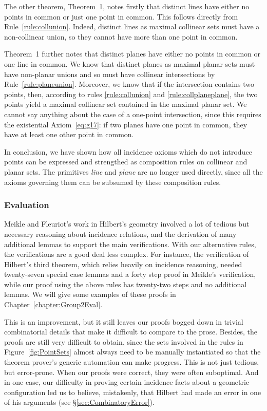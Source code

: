 The other theorem, Theorem~1, notes firstly that distinct lines have either no points in common or just one point in common. This follows directly from Rule~\ref{rule:collunion}. Indeed, distinct lines as maximal collinear sets must have a non-collinear union, so they cannot have more than one point in common. 

Theorem~1 further notes that distinct planes have either no points in common or one line in common. We know that distinct planes as maximal planar sets must have non-planar unions and so must have collinear intersections by Rule~\ref{rule:planeunion}. Moreover, we know that if the intersection contains two points, then, according to rules \ref{rule:collunion} and \ref{rule:collplaneplane}, the two points yield a maximal collinear set contained in the maximal planar set. We cannot say anything about the case of a one-point intersection, since this requires the existential Axiom~\ref{eq:g17}: if two planes have one point in common, they have at least one other point in common.

In conclusion, we have shown how all incidence axioms which do not introduce points can be expressed and strengthed as composition rules on collinear and planar sets. The primitives \emph{line} and \emph{plane} are no longer used directly, since all the axioms governing them can be subsumed by these composition rules. 

\subsubsection{Evaluation}
Meikle and Fleuriot's work in Hilbert's geometry involved a lot of tedious but necessary reasoning about incidence relations, and the derivation of many additional lemmas to support the main verifications. With our alternative rules, the verifications are a good deal less complex. For instance, the verification of Hilbert's third theorem, which relies heavily on incidence reasoning, needed twenty-seven special case lemmas and a forty step proof in Meikle's verification, while our proof using the above rules has twenty-two steps and no additional lemmas. We will give some examples of these proofs in Chapter~\ref{chapter:Group2Eval}.

This is an improvement, but it still leaves our proofs bogged down in trivial combinatorial details that make it difficult to compare to the prose. Besides, the proofs are still very difficult to obtain, since the sets involved in the rules in Figure~\ref{fig:PointSets} almost always need to be manually instantiated so that the theorem prover's generic automation can make progress. This is not just tedious, but error-prone. When our proofs were correct, they were often suboptimal. And in one case, our difficulty in proving certain incidence facts about a geometric configuration led us to believe, mistakenly, that Hilbert had made an error in one of his arguments (see \S\ref{sec:CombinatoryError}).


